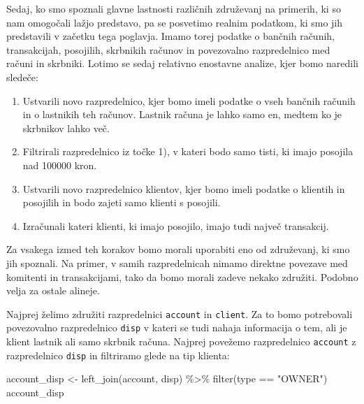 \documentclass[
]{book}
\newenvironment{Shaded}{\begin{snugshade}}{\end{snugshade}}
\newcommand{\FunctionTok}[1]{\textcolor[rgb]{0.00,0.00,0.00}{#1}}
\newcommand{\NormalTok}[1]{#1}
\newcommand{\OtherTok}[1]{\textcolor[rgb]{0.56,0.35,0.01}{#1}}
\newcommand{\SpecialCharTok}[1]{\textcolor[rgb]{0.00,0.00,0.00}{#1}}
\newcommand{\StringTok}[1]{\textcolor[rgb]{0.31,0.60,0.02}{#1}}
\providecommand{\tightlist}{%
  \setlength{\itemsep}{0pt}\setlength{\parskip}{0pt}}
\begin{document}
Sedaj, ko smo spoznali glavne lastnosti različnih združevanj na primerih, ki so nam omogočali lažjo predstavo, pa se posvetimo realnim podatkom, ki smo jih predstavili v začetku tega poglavja. Imamo torej podatke o bančnih računih, transakcijah, posojilih, skrbnikih računov in povezovalno razpredelnico med računi in skrbniki. Lotimo se sedaj relativno enostavne analize, kjer bomo naredili sledeče:

\begin{enumerate}
\def\labelenumi{\arabic{enumi})}
\tightlist
\item
  Ustvarili novo razpredelnico, kjer bomo imeli podatke o vseh bančnih računih in o lastnikih teh računov. Lastnik računa je lahko samo en, medtem ko je skrbnikov lahko več.
\item
  Filtrirali razpredelnico iz točke 1), v kateri bodo samo tisti, ki imajo posojila nad 100000 kron.
\item
  Ustvarili novo razpredelnico klientov, kjer bomo imeli podatke o klientih in posojilih in bodo zajeti samo klienti s posojili.
\item
  Izračunali kateri klienti, ki imajo posojilo, imajo tudi največ transakcij.
\end{enumerate}

Za vsakega izmed teh korakov bomo morali uporabiti eno od združevanj, ki smo jih spoznali. Na primer, v samih razpredelnicah nimamo direktne povezave med komitenti in transakcijami, tako da bomo morali zadeve nekako združiti. Podobno velja za ostale alineje.

Najprej želimo združiti razpredelnici \texttt{account} in \texttt{client}. Za to bomo potrebovali povezovalno razpredelnico \texttt{disp} v kateri se tudi nahaja informacija o tem, ali je klient lastnik ali samo skrbnik računa. Najprej povežemo razpredelnico \texttt{account} z razpredelnico \texttt{disp} in filtriramo glede na tip klienta:

\begin{Shaded}
\begin{Highlighting}[]
\NormalTok{account\_disp }\OtherTok{\textless{}{-}} \FunctionTok{left\_join}\NormalTok{(account, disp) }\SpecialCharTok{\%\textgreater{}\%}
  \FunctionTok{filter}\NormalTok{(type }\SpecialCharTok{==} \StringTok{"OWNER"}\NormalTok{)}
\NormalTok{account\_disp}
\end{Highlighting}
\end{Shaded}
\end{document}
